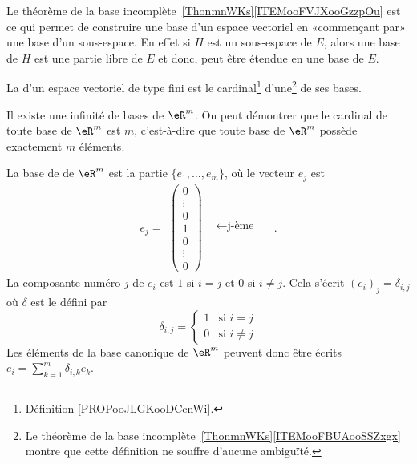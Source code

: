 \begin{remark}      \label{REMooYGJEooEcZQKa}
	Le théorème de la base incomplète~\ref{ThonmnWKs}\ref{ITEMooFVJXooGzzpOu} est ce qui permet de construire une base d'un espace vectoriel en «commençant par» une base d'un sous-espace. En effet si \( H\) est un sous-espace de \( E\), alors une base de \( H\) est une partie libre de \( E\) et donc, peut être étendue en une base de \( E\).
\end{remark}

\begin{definition}      \label{DEFooWRLKooArTpgh}
	La  d'un espace vectoriel de type fini est le cardinal\footnote{Définition \ref{PROPooJLGKooDCcnWi}.} d'une\footnote{Le théorème de la base incomplète~\ref{ThonmnWKs}\ref{ITEMooFBUAooSSZxgx} montre que cette définition ne souffre d'aucune ambiguïté.} de ses bases.
\end{definition}

Il existe une infinité de bases de \( \eR^m\). On peut démontrer que le cardinal de toute base de \( \eR^m\) est \( m\), c'est-à-dire que toute base de \( \eR^m\) possède exactement \( m\) éléments.

\begin{example}
	La base de  de \( \eR^m\) est la partie \( \{e_1,\ldots, e_m\}\), où le vecteur \( e_j\) est
	\begin{equation}\nonumber
		e_j=
		\begin{array}{cc}
			\begin{pmatrix}
				0 \\\vdots\\0\\1\\ 0\\\vdots\\0
			\end{pmatrix} &
			\begin{matrix}
				\quad \\\quad\\\leftarrow\textrm{j-ème} \quad\\\quad\\\quad\\
			\end{matrix}
		\end{array}.
	\end{equation}
	La composante numéro \( j\) de \( e_i\) est \( 1\) si \( i=j\) et \( 0\) si \( i\neq j\). Cela s'écrit \( (e_i)_j=\delta_{i,j}\) où \( \delta\) est le  défini par
	\begin{equation}
		\delta_{i,j}=\begin{cases}
			1 & \text{si }i=j     \\
			0 & \text{si }i\neq j
		\end{cases}
	\end{equation}
	Les éléments de la base canonique de \( \eR^m\) peuvent donc être écrits \( e_i=\sum_{k=1}^m\delta_{i,k}e_k\).
\end{example}

